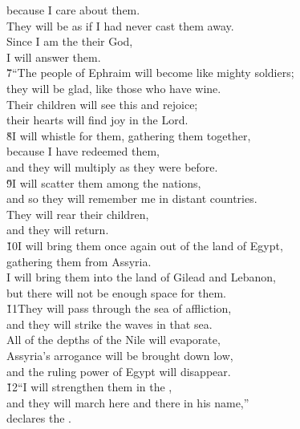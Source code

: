 \begin{poetry}
\poemll    because I care about them. \\
\poeml They will be as if I had never cast them away. \\
\poemll    Since I am the  their God, \\
\poemlll       I will answer them. \\
\poeml \v{7}``The people of Ephraim will become like mighty soldiers; \\
\poemll    they will be glad, like those who have wine. \\
\poeml Their children will see this and rejoice; \\
\poemll    their hearts will find joy in the Lord. \\
\poeml \v{8}I will whistle for them, gathering them together, \\
\poemll    because I have redeemed them, \\
\poemlll       and they will multiply as they were before. \\
\poeml \v{9}I will scatter them among the nations, \\
\poemll    and so they will remember me in distant countries. \\
\poeml They will rear their children, \\
\poemll    and they will return. \\
\poeml \v{10}I will bring them once again out of the land of Egypt, \\
\poemll    gathering them from Assyria. \\
\poeml I will bring them into the land of Gilead and Lebanon, \\
\poemll    but there will not be enough space for them. \\
\poeml \v{11}They will pass through the sea of affliction, \\
\poemll    and they will strike the waves in that sea. \\
\poeml All of the depths of the Nile will evaporate, \\
\poemll    Assyria's arrogance will be brought down low, \\
\poemlll       and the ruling power of Egypt will disappear. \\
\poeml \v{12}``I will strengthen them in the , \\
\poemll    and they will march here and there in his name,'' \\
\poemlll       declares the .
\end{poetry}

